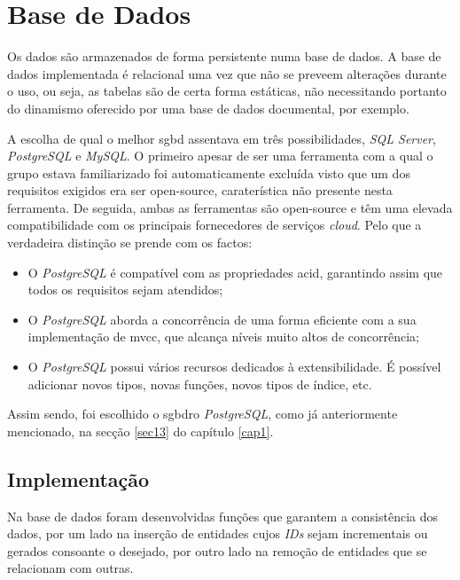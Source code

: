 %
%
\section{Base de Dados}\label{sec32}

Os dados são armazenados de forma persistente numa base de dados. A base de dados implementada é relacional uma vez que não se preveem alterações durante o uso, ou seja, as tabelas são de certa forma estáticas, não necessitando portanto do dinamismo oferecido por uma base de dados documental, por exemplo. 

 A escolha de qual o melhor \acrshort{sgbd} assentava em três possibilidades, \textit{SQL Server}, \textit{PostgreSQL} e \textit{MySQL}. O primeiro apesar de ser uma ferramenta com a qual o grupo estava familiarizado foi automaticamente excluída visto que um dos requisitos exigidos era ser \gls{open-source}, caraterística não presente nesta ferramenta. De seguida, ambas as ferramentas são \gls{open-source} e têm uma elevada compatibilidade com os principais fornecedores de serviços \textit{cloud}. Pelo que a verdadeira distinção se prende com os factos:
 	\begin{itemize}
 		\item O \textit{PostgreSQL} é compatível com as propriedades \acrfull{acid}, garantindo assim que todos os requisitos sejam atendidos;
 		\item O \textit{PostgreSQL} aborda a concorrência de uma forma eficiente com a sua implementação de \acrfull{mvcc}, que alcança níveis muito altos de concorrência;
 		\item O \textit{PostgreSQL} possui vários recursos dedicados à extensibilidade. É possível adicionar novos tipos, novas funções, novos tipos de índice, etc.
	\end{itemize}
 Assim sendo, foi escolhido o \acrfull{sgbdro} \textit{PostgreSQL}, como já anteriormente mencionado, na secção \ref{sec13} do capítulo \ref{cap1}.
 
 \subsection{Implementação}\label{subsec321}
 
Na base de dados foram desenvolvidas funções que garantem a consistência dos dados, por um lado na inserção de entidades cujos \textit{IDs} sejam incrementais ou gerados consoante o desejado, por outro lado na remoção  de entidades que se relacionam com outras.